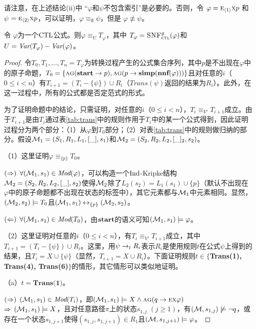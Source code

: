 请注意，在上述结论(ii)中  “$\varphi$和$\psi$不包含索引”是必要的。否则，令 $\varphi=\textsc{e}_{{\langle{1}\rangle}}\textsc{x} p$ 和  
$\psi$ $=\textsc{e}_{{\langle{2}\rangle}}\textsc{x} p$，可以证明，$\varphi\equiv_\emptyset \psi$，但是 $\varphi\not\equiv\psi$。
\begin{proposition}\label{prop:transform:V:EQ}
	令 $\varphi$为一个$\textrm{CTL}$公式。则$\varphi\equiv_UT_\varphi$，其中 $T_\varphi={\textsc{SNF}_{\textsc{ctl}}^g}(\varphi)$和
	$U=\textit{Var}(T_\varphi)-\textit{Var}(\varphi)$。
\end{proposition}
\begin{proof}
	令$T_0, T_1, \dots, T_n=T_{\varphi}$为转换过程产生的公式集合序列，其中$p$是不出现在$\varphi$中的原子命题，$T_0=\{\textsc{a} \textsc{g}(\textbf{start} \rightarrow p), \textsc{a} \textsc{g}(p \rightarrow \textbf{simp}(\textbf{nnf}(\varphi)))\}$且对任意的$i$（$0\leq i < n$）有$T_{i+1} = (T_i-\{\psi\}) \cup R_i$（$Trans(\psi)$返回的结果为$R_i$）。此外，在这一过程中，所有的公式都是否定范式的形式。
	
	为了证明命题中的结论，只需证明，对任意的$i$（$0\leq i < n$），$T_i \equiv_{V'} T_{i+1}$成立。由于$T_{i+1}$是由$T_i$通过表\ref{tab:trans}中的规则作用于$T_i$中的某一个公式得到，因此证明过程分为两个部分：（1）从$\varphi$到$T_0$部分；（2）对表\ref{tab:trans}中的规则做归纳的部分。假设${\cal M}_1=(S_1,R_1,L_1,[\_],s_1)$和${\cal M}_2=(S_2,R_2,L_2, [\_]_2, s_2)$。
	
	（1）这里证明$\varphi \equiv_{\{p\}} T_0$。
	
	$(\Rightarrow)$ $\forall ({\cal M}_1, s_1) \in \textit{Mod}(\varphi)$，可以构造一个$\textrm{Ind}$-Kripke结构${\cal M}_2=(S_2,R_2,L_2,[\_],s_2)$使得${\cal M}_2$除了$L_2(s_2)=L_1(s_1) \cup \{p\}$（默认不出现在$\varphi$中的原子命题都不出现在状态的标签中），其它元素都与${\cal M}_1$中元素相同。显然，$({\cal M}_2,s_2)\models T_0$且$({\cal M}_1,s_1) \leftrightarrow_{\{p\}} ({\cal M}_2, s_2)$。
	
	$(\Leftarrow)$ $\forall ({\cal M}_1,s_1) \in \textit{Mod}(T_0)$，由$\textbf{start}$的语义可知$({\cal M}_1,s_1) \models \varphi$。
	
	（2）这里证明对任意的$i$（$0\leq i < n$），有$T_i \equiv_{V'} T_{i+1}$成立，其中$T_{i+1} = (T_i-\{\psi\}) \cup R_i$。这里，用$\psi \rightarrow_t R_i$表示$R_i$是使用规则$t$在公式$\psi$上得到的结果，且$T_i=X\cup \{\psi\}$（显然，$T_{i+1}=X\cup R_i$）。下面证明规则$t\in \{$\textbf{Trans(1), Trans(4), Trans(6)}$\}$的情形，其它情形可以类似地证明。
	
	（a）$t=\textbf{Trans(1)}$。
	
	$(\Rightarrow)$ $({\cal M}_1,s_1)\in \textit{Mod}(T_i)$，即$({\cal M}_1, s_1) \models X \wedge \textsc{a}\textsc{g}(q \rightarrow \textsc{e} \textsc{x} \varphi)$\\
	$\Rightarrow$ $({\cal M}_1,s_1) \models X$，且对任意路径$\pi$上的状态$s_{1,j}$ $(j\geq 1)$，有$({\cal M},s_{1,j}) \not \models \neg q$，或存在一个状态$s_{1,j+1}$使得$(s_{1,j},s_{1,j+1})
	\in R_1$且$({\cal M},s_{1,j+1}) \models \varphi$。
	

\end{proof}

